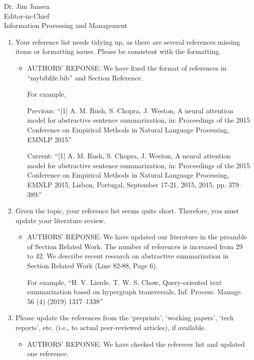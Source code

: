 \documentclass[11pt]{letter} %
\begin{document}
\begin{letter}{Dr. Jim Jansen \\
			Editor-in-Chief  \\
			Information Processing and Management}
\begin{enumerate}
\begin{itemize}
				 This paper proposed sentence-level method on abstractive summarization. As shown in manuscript ``paper.pdf'' (Line 92, page 6), we introduce their approach as follows:
                 ``Tan [30] and Li [31, 32] encode sentence using word vectors and predicts words from sentence vector in sequential order whereas CNN-based models are naturally parallelized.''		
			\end{itemize}
			\item Your reference list needs tidying up, as there are several references missing items or formatting issues. Please be consistent with the formatting. 
			\begin{itemize}
				\item[] AUTHORS' REPONSE: We have fixed the format of references in ``mybibfile.bib'' and Section Reference.
                
				For example,
				
				Previous: ``[1] A. M. Rush, S. Chopra, J. Weston, A neural attention model for abstractive sentence summarization, in: Proceedings of the 2015 Conference on Empirical Methods in Natural Language Processing, EMNLP 2015''
				
                Current: ``[1] A. M. Rush, S. Chopra, J. Weston, A neural attention model for abstractive sentence summarization, in: Proceedings of the 2015 Conference on Empirical Methods in Natural Language Processing, EMNLP 2015, Lisbon, Portugal, September 17-21, 2015, 2015, pp. 379–389.''
                				
			\end{itemize}
			\item Given the topic, your reference list seems quite short. Therefore, you must update your literature review.
			\begin{itemize}
				\item[] AUTHORS' REPONSE: We have updated our literature in the preamble of Section Related Work. The number of references is increased from 29 to 42.
				We describe recent research on abstractive summarization in Section Related Work (Line 82-88, Page 6).
                
				For example,
                ``H. V. Lierde, T. W. S. Chow, Query-oriented text summarization based on hypergraph transversals, Inf. Process. Manage. 56 (4) (2019) 1317–1338''
			\end{itemize}
			\item Please update the references from the ‘preprints', ‘working papers’, ‘tech reports’, etc. (i.e., to actual peer-reviewed articles), if available.
			\begin{itemize}
				\item[] AUTHORS' REPONSE: We have checked the refereces list and updated one reference.
                

\end{itemize}
\end{enumerate}
\end{letter}
\end{document}
